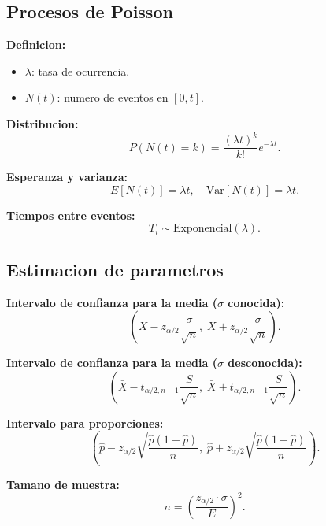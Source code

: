 \documentclass{article}
\begin{document}
\subsection{Procesos de Poisson}

\textbf{Definicion:}
\begin{itemize}
  \item $\lambda$: tasa de ocurrencia.
  \item $N(t)$: numero de eventos en $[0,t]$.
\end{itemize}

\textbf{Distribucion:}
\[
P(N(t) = k) = \frac{(\lambda t)^k}{k!} e^{-\lambda t}.
\]

\textbf{Esperanza y varianza:}
\[
E[N(t)] = \lambda t, \quad \text{Var}[N(t)] = \lambda t.
\]

\textbf{Tiempos entre eventos:}
\[
T_i \sim \text{Exponencial}(\lambda).
\]

\subsection{Estimacion de parametros}

\textbf{Intervalo de confianza para la media ($\sigma$ conocida):}
\[
\left( \bar{X} - z_{\alpha/2} \frac{\sigma}{\sqrt{n}}, \; \bar{X} + z_{\alpha/2} \frac{\sigma}{\sqrt{n}} \right).
\]

\textbf{Intervalo de confianza para la media ($\sigma$ desconocida):}
\[
\left( \bar{X} - t_{\alpha/2, n-1} \frac{S}{\sqrt{n}}, \; \bar{X} + t_{\alpha/2, n-1} \frac{S}{\sqrt{n}} \right).
\]

\textbf{Intervalo para proporciones:}
\[
\left( \hat{p} - z_{\alpha/2} \sqrt{\frac{\hat{p}(1-\hat{p})}{n}}, \; \hat{p} + z_{\alpha/2} \sqrt{\frac{\hat{p}(1-\hat{p})}{n}} \right).
\]

\textbf{Tamano de muestra:}
\[
n = \left( \frac{z_{\alpha/2} \cdot \sigma}{E} \right)^2.
\]
\end{document}
